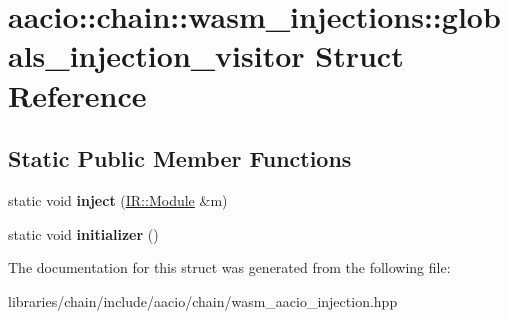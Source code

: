 \hypertarget{structaacio_1_1chain_1_1wasm__injections_1_1globals__injection__visitor}{}\section{aacio\+:\+:chain\+:\+:wasm\+\_\+injections\+:\+:globals\+\_\+injection\+\_\+visitor Struct Reference}
\label{structaacio_1_1chain_1_1wasm__injections_1_1globals__injection__visitor}
\subsection*{Static Public Member Functions}
\begin{DoxyCompactItemize}
\item 
\mbox{\label{structaacio_1_1chain_1_1wasm__injections_1_1globals__injection__visitor_a9788d109cfdb288f5b775ac115387805}} 
static void {\bfseries inject} (\mbox{\hyperlink{struct_i_r_1_1_module}{I\+R\+::\+Module}} \&m)
\item 
\mbox{\label{structaacio_1_1chain_1_1wasm__injections_1_1globals__injection__visitor_a99d74125b2af98fda82e8d5b3ce76d27}} 
static void {\bfseries initializer} ()
\end{DoxyCompactItemize}


The documentation for this struct was generated from the following file\+:\begin{DoxyCompactItemize}
\item 
libraries/chain/include/aacio/chain/wasm\+\_\+aacio\+\_\+injection.\+hpp\end{DoxyCompactItemize}
